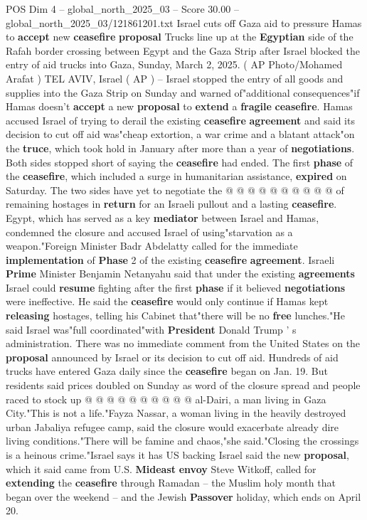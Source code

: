 \begin{textsample}{POS Dim 4 – global\_north\_2025\_03 – Score 30.00 – global\_north\_2025\_03/121861201.txt}  \label{ex:f4_pos_069}
Israel cuts off Gaza aid to pressure Hamas to \textbf{accept} new \textbf{ceasefire} \textbf{proposal} Trucks line up at the \textbf{Egyptian} side of the Rafah border crossing between Egypt and the Gaza Strip after Israel blocked the entry of aid trucks into Gaza, Sunday, March 2, 2025. ( AP Photo/Mohamed Arafat ) TEL AVIV, Israel ( AP ) -- Israel stopped the entry of all goods and supplies into the Gaza Strip on Sunday and warned of"additional consequences"if Hamas doesn't \textbf{accept} a new \textbf{proposal} to \textbf{extend} a \textbf{fragile} \textbf{ceasefire}.
Hamas accused Israel of trying to derail the existing \textbf{ceasefire} \textbf{agreement} and said its decision to cut off aid was"cheap extortion, a war crime and a blatant attack"on the \textbf{truce}, which took hold in January after more than a year of \textbf{negotiations}.
Both sides stopped short of saying the \textbf{ceasefire} had ended.
The first \textbf{phase} of the \textbf{ceasefire}, which included a surge in humanitarian assistance, \textbf{expired} on Saturday.
The two sides have yet to negotiate the @ @ @ @ @ @ @ @ @ @ of remaining hostages in \textbf{return} for an Israeli pullout and a lasting \textbf{ceasefire}.
Egypt, which has served as a key \textbf{mediator} between Israel and Hamas, condemned the closure and accused Israel of using"starvation as a weapon."Foreign Minister Badr Abdelatty called for the immediate \textbf{implementation} of \textbf{Phase} 2 of the existing \textbf{ceasefire} \textbf{agreement}.
Israeli \textbf{Prime} Minister Benjamin Netanyahu said that under the existing \textbf{agreements} Israel could \textbf{resume} fighting after the first \textbf{phase} if it believed \textbf{negotiations} were ineffective.
He said the \textbf{ceasefire} would only continue if Hamas kept \textbf{releasing} hostages, telling his Cabinet that"there will be no \textbf{free} lunches."He said Israel was"full coordinated"with \textbf{President} Donald Trump ' s administration.
There was no immediate comment from the United States on the \textbf{proposal} announced by Israel or its decision to cut off aid.
Hundreds of aid trucks have entered Gaza daily since the \textbf{ceasefire} began on Jan. 19.
But residents said prices doubled on Sunday as word of the closure spread and people raced to stock up @ @ @ @ @ @ @ @ @ @ al-Dairi, a man living in Gaza City."This is not a life."Fayza Nassar, a woman living in the heavily destroyed urban Jabaliya refugee camp, said the closure would exacerbate already dire living conditions."There will be famine and chaos,"she said."Closing the crossings is a heinous crime."Israel says it has US backing Israel said the new \textbf{proposal}, which it said came from U.S. \textbf{Mideast} \textbf{envoy} Steve Witkoff, called for \textbf{extending} the \textbf{ceasefire} through Ramadan -- the Muslim holy month that began over the weekend -- and the Jewish \textbf{Passover} holiday, which ends on April 20.

\end{textsample}
